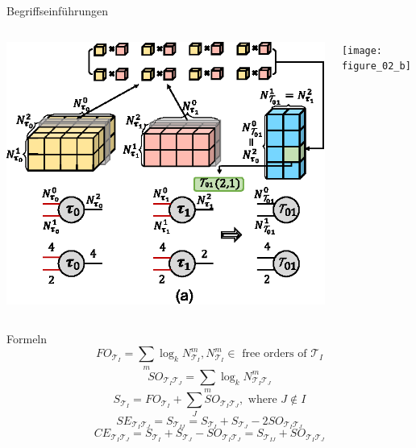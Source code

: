 \documentclass{beamer}
\newcommand{\Tau}{\mathcal{T}}
\begin{document}
\begin{frame}{Begriffseinführungen}
	\begin{columns}
		\begin{column}{0.5\textwidth}
			\includegraphics[scale=.2]{figure_02_a}
		\end{column}
		\begin{column}{0.5\textwidth}
			\texttt{[image: figure\_02\_b]}
		\end{column}
	\end{columns}
\end{frame}

\begin{frame}{Formeln}
	\begin{equation}
		FO_{\Tau_I}=\sum\limits_m \log_k N_{\Tau_I}^m, N_{\Tau_I}^m \in \text{ free orders of } \Tau_I
	\end{equation}
	\begin{equation}
		SO_{\Tau_I\Tau_J}=\sum\limits_m \log_k N_{\Tau_I\Tau_J}^m
	\end{equation}
	\begin{equation}
		S_{\Tau_I}=FO_{\Tau_I}+\sum\limits_J SO_{\Tau_I\Tau_J}, \text{ where } J\notin I
	\end{equation}
	\begin{equation}
		SE_{\Tau_I\Tau_J}=S_{\Tau_{IJ}}=S_{\Tau_I}+S_{\Tau_J}-2SO_{\Tau_I\Tau_J}
	\end{equation}
	\begin{equation}
		CE_{\Tau_I\Tau_J}=S_{\Tau_I}+S_{\Tau_J}-SO_{\Tau_I\Tau_J}=S_{\Tau_{IJ}}+SO_{\Tau_I\Tau_J}
	\end{equation}
\end{frame}
\end{document}
